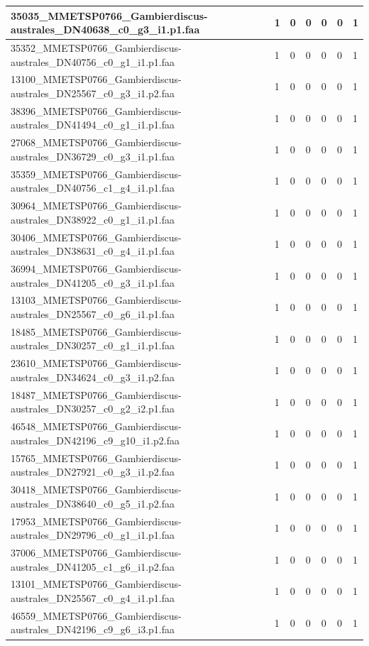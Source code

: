 \documentclass[12pt]{article}
\begin{document}
\begin{longtable}{ | p{2cm} | p{2cm} |p{2.5cm} | p{2cm} | p{2.5cm} |  p{2cm} | p{2cm} |}
 \hline 
35035\_MMETSP0766\_Gambierdiscus-australes\_DN40638\_c0\_g3\_i1.p1.faa&1&0&0&0&0&1\\ 
 \hline 
35352\_MMETSP0766\_Gambierdiscus-australes\_DN40756\_c0\_g1\_i1.p1.faa&1&0&0&0&0&1\\ 
 \hline 
13100\_MMETSP0766\_Gambierdiscus-australes\_DN25567\_c0\_g3\_i1.p2.faa&1&0&0&0&0&1\\ 
 \hline 
38396\_MMETSP0766\_Gambierdiscus-australes\_DN41494\_c0\_g1\_i1.p1.faa&1&0&0&0&0&1\\ 
 \hline 
27068\_MMETSP0766\_Gambierdiscus-australes\_DN36729\_c0\_g3\_i1.p1.faa&1&0&0&0&0&1\\ 
 \hline 
35359\_MMETSP0766\_Gambierdiscus-australes\_DN40756\_c1\_g4\_i1.p1.faa&1&0&0&0&0&1\\ 
 \hline 
30964\_MMETSP0766\_Gambierdiscus-australes\_DN38922\_c0\_g1\_i1.p1.faa&1&0&0&0&0&1\\ 
 \hline 
30406\_MMETSP0766\_Gambierdiscus-australes\_DN38631\_c0\_g4\_i1.p1.faa&1&0&0&0&0&1\\ 
 \hline 
36994\_MMETSP0766\_Gambierdiscus-australes\_DN41205\_c0\_g3\_i1.p1.faa&1&0&0&0&0&1\\ 
 \hline 
13103\_MMETSP0766\_Gambierdiscus-australes\_DN25567\_c0\_g6\_i1.p1.faa&1&0&0&0&0&1\\ 
 \hline 
18485\_MMETSP0766\_Gambierdiscus-australes\_DN30257\_c0\_g1\_i1.p1.faa&1&0&0&0&0&1\\ 
 \hline 
23610\_MMETSP0766\_Gambierdiscus-australes\_DN34624\_c0\_g3\_i1.p2.faa&1&0&0&0&0&1\\ 
 \hline 
18487\_MMETSP0766\_Gambierdiscus-australes\_DN30257\_c0\_g2\_i2.p1.faa&1&0&0&0&0&1\\ 
 \hline 
46548\_MMETSP0766\_Gambierdiscus-australes\_DN42196\_c9\_g10\_i1.p2.faa&1&0&0&0&0&1\\ 
 \hline 
15765\_MMETSP0766\_Gambierdiscus-australes\_DN27921\_c0\_g3\_i1.p2.faa&1&0&0&0&0&1\\ 
 \hline 
30418\_MMETSP0766\_Gambierdiscus-australes\_DN38640\_c0\_g5\_i1.p2.faa&1&0&0&0&0&1\\ 
 \hline 
17953\_MMETSP0766\_Gambierdiscus-australes\_DN29796\_c0\_g1\_i1.p1.faa&1&0&0&0&0&1\\ 
 \hline 
37006\_MMETSP0766\_Gambierdiscus-australes\_DN41205\_c1\_g6\_i1.p2.faa&1&0&0&0&0&1\\ 
 \hline 
13101\_MMETSP0766\_Gambierdiscus-australes\_DN25567\_c0\_g4\_i1.p1.faa&1&0&0&0&0&1\\ 
 \hline 
46559\_MMETSP0766\_Gambierdiscus-australes\_DN42196\_c9\_g6\_i3.p1.faa&1&0&0&0&0&1\\ 

\end{longtable}
\end{document}
